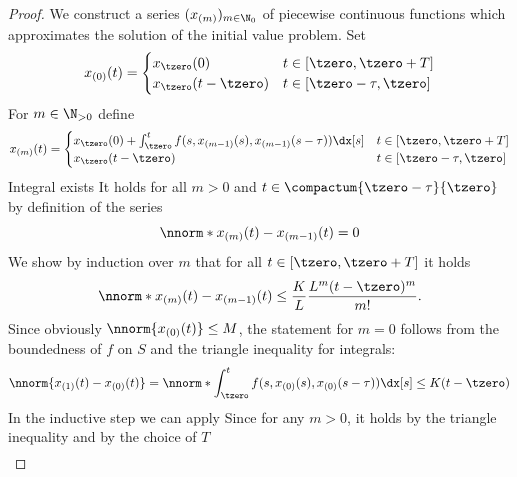 \begin{proof}
        We construct a series $(x_{(m)})_{m\in\N_0}$ of piecewise continuous functions which approximates the solution of the initial value problem.
        Set
        \begin{equation}
            x_{(0)}(t)= \begin{cases}
                x_\tzero(0) & t\in [\tzero,\tzero+T]\\
                x_\tzero(t-\tzero) & t\in [\tzero-\tau,\tzero]
            \end{cases}
        \end{equation}
        For $m\in\N_{>0}$ define
        \begin{equation}
            x_{(m)}(t)= \begin{cases}
                x_\tzero(0) + \int_\tzero^t f(s,x_{(m-1)}(s),x_{(m-1)}(s-\tau))\dx[s] & t\in [\tzero,\tzero+T]\\
                x_\tzero(t-\tzero) & t\in [\tzero-\tau,\tzero]
            \end{cases}
        \end{equation}
        Integral exists
        It holds for all $m>0$ and $t\in \compactum{\tzero-\tau}{\tzero}$ by definition of the series
        \begin{equation}
            \nnorm*{x_{(m)}(t)-x_{(m-1)}(t)}=0
        \end{equation}
        We show by induction over $m$ that for all $t\in [\tzero,\tzero+T]$ it holds
        \begin{equation}
            \nnorm*{x_{(m)}(t)-x_{(m-1)}(t)} \leq \frac{K}{L}\frac{L^m (t-\tzero)^m}{m!}.
        \end{equation}
        Since obviously $\nnorm{x_{(0)}(t)}\leq M$, the statement for $m=0$ follows from the boundedness of $f$ on $S$ and the triangle inequality for integrals:
        \begin{equation}
            \nnorm{x_{(1)}(t)-x_{(0)}(t)} = \nnorm*{\int_\tzero^t f(s,x_{(0)}(s),x_{(0)}(s-\tau))\dx[s]} \leq K(t-\tzero)
        \end{equation}
        In the inductive step we can apply
        Since for any $m>0$, it holds by the triangle inequality and by the choice of $T$
        \begin{align}\label{eq:bounded-xm}

\end{align}
\end{proof}
